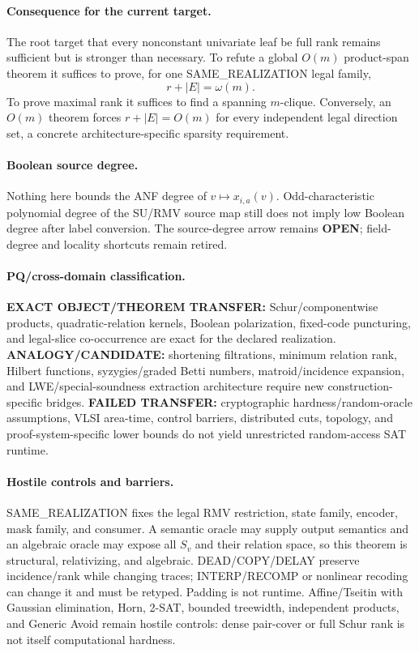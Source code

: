 \documentclass[11pt]{article}
\begin{document}
\paragraph{Consequence for the current target.}
The root target that every nonconstant univariate leaf be full rank remains sufficient but is stronger than necessary. To refute a global \(O(m)\) product-span theorem it suffices to prove, for one SAME\_REALIZATION legal family,
\[
r+|E|=\omega(m).
\]
To prove maximal rank it suffices to find a spanning \(m\)-clique. Conversely, an \(O(m)\) theorem forces \(r+|E|=O(m)\) for every independent legal direction set, a concrete architecture-specific sparsity requirement.

\paragraph{Boolean source degree.}
Nothing here bounds the ANF degree of \(v\mapsto x_{i,a}(v)\). Odd-characteristic polynomial degree of the SU/RMV source map still does not imply low Boolean degree after label conversion. The source-degree arrow remains \textbf{OPEN}; field-degree and locality shortcuts remain retired.

\paragraph{PQ/cross-domain classification.}
\textbf{EXACT OBJECT/THEOREM TRANSFER:} Schur/componentwise products, quadratic-relation kernels, Boolean polarization, fixed-code puncturing, and legal-slice co-occurrence are exact for the declared realization.
\textbf{ANALOGY/CANDIDATE:} shortening filtrations, minimum relation rank, Hilbert functions, syzygies/graded Betti numbers, matroid/incidence expansion, and LWE/special-soundness extraction architecture require new construction-specific bridges.
\textbf{FAILED TRANSFER:} cryptographic hardness/random-oracle assumptions, VLSI area-time, control barriers, distributed cuts, topology, and proof-system-specific lower bounds do not yield unrestricted random-access SAT runtime.

\paragraph{Hostile controls and barriers.}
SAME\_REALIZATION fixes the legal RMV restriction, state family, encoder, mask family, and consumer. A semantic oracle may supply output semantics and an algebraic oracle may expose all \(S_v\) and their relation space, so this theorem is structural, relativizing, and algebraic. DEAD/COPY/DELAY preserve incidence/rank while changing traces; INTERP/RECOMP or nonlinear recoding can change it and must be retyped. Padding is not runtime. Affine/Tseitin with Gaussian elimination, Horn, 2-SAT, bounded treewidth, independent products, and Generic Avoid remain hostile controls: dense pair-cover or full Schur rank is not itself computational hardness.
\end{document}

